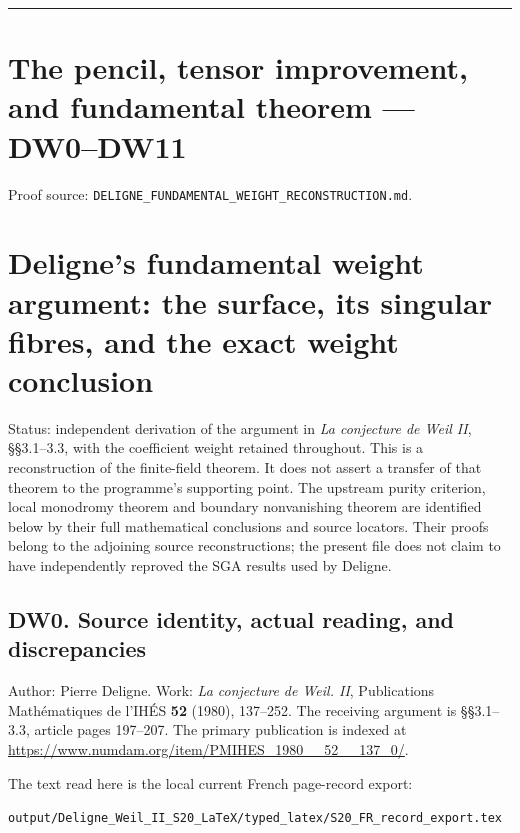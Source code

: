 \documentclass[
]{report}
\begin{document}
\begin{center}\rule{0.5\linewidth}{0.5pt}\end{center}

\chapter{The pencil, tensor improvement, and fundamental theorem ---
DW0--DW11}\label{the-pencil-tensor-improvement-and-fundamental-theorem-dw0dw11}

Proof source: \nolinkurl{DELIGNE_FUNDAMENTAL_WEIGHT_RECONSTRUCTION.md}.

\chapter{Deligne's fundamental weight argument: the surface, its
singular fibres, and the exact weight
conclusion}\label{delignes-fundamental-weight-argument-the-surface-its-singular-fibres-and-the-exact-weight-conclusion}

Status: independent derivation of the argument in \emph{La conjecture de
Weil II}, §§3.1--3.3, with the coefficient weight retained throughout.
This is a reconstruction of the finite-field theorem. It does not assert
a transfer of that theorem to the programme's supporting point. The
upstream purity criterion, local monodromy theorem and boundary
nonvanishing theorem are identified below by their full mathematical
conclusions and source locators. Their proofs belong to the adjoining
source reconstructions; the present file does not claim to have
independently reproved the SGA results used by Deligne.

\section{DW0. Source identity, actual reading, and
discrepancies}\label{dw0.-source-identity-actual-reading-and-discrepancies}

Author: Pierre Deligne. Work: \emph{La conjecture de Weil. II},
Publications Mathématiques de l'IHÉS \textbf{52} (1980), 137--252. The
receiving argument is §§3.1--3.3, article pages 197--207. The primary
publication is indexed at
\url{https://www.numdam.org/item/PMIHES_1980__52__137_0/}.

The text read here is the local current French page-record export:

\nolinkurl{output/Deligne_Weil_II_S20_LaTeX/typed_latex/S20_FR_record_export.tex}
\end{document}
